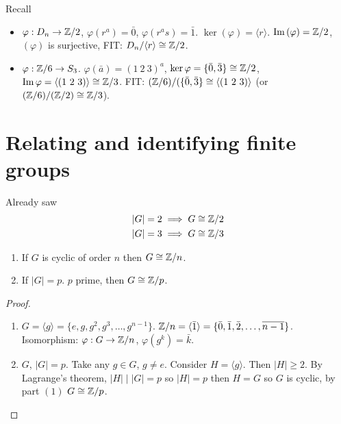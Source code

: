 \documentclass[10pt, a4paper]{article}
\begin{document}
\begin{example}
    Recall
    \begin{itemize}
        \item $\varphi : D_n \to \mathbb{Z} / 2$,
        $\varphi(r ^ a) = \bar{0}$,
        $\varphi(r ^ as) = \bar{1}$.
        $\ker(\varphi) = \langle r\rangle$.
        $\mathrm{Im}\,(\varphi) = \mathbb{Z} / 2$,
        $(\varphi)$ is surjective,
        FIT:
        $D_n / \langle r\rangle \cong \mathbb{Z} / 2$.

        \item $\varphi : \mathbb{Z} / 6 \to S_3$.
        $\varphi(\bar{a}) = (1\ 2\ 3) ^ a$,
        $\ker{\varphi} = \{\bar{0}, \bar{3}\} \cong \mathbb{Z} / 2$,
        $\Im{\varphi} = \langle (1\ 2\ 3)\rangle \cong \Z / 3$.
        FIT:
        $(\mathbb{Z} / 6) / (\{\bar{0}, \bar{3}\} \cong \langle (1\ 2\ 3)\rangle$
        (or $(\mathbb{Z} / 6) / (\mathbb{Z} / 2) \cong \mathbb{Z} / 3$).
    \end{itemize}
\end{example}

\newpage

\section{Relating and identifying finite groups}
Already saw
\begin{align*}
    |G| = 2 &\implies G \cong \mathbb{Z} / 2 \\
    |G| = 3 &\implies G \cong \mathbb{Z} / 3
\end{align*}

\begin{lemma}\phantom{}
    \begin{enumerate}[label = (\arabic*)]
        \item If $G$ is cyclic of order $n$ then $G \cong \mathbb{Z} / n$.

        \item If $|G| = p$.
        $p$ prime,
        then $G \cong \mathbb{Z} / p$.
    \end{enumerate}

    \begin{proof}\phantom{}
        \begin{enumerate}[label = (\arabic*)]
            \item $G = \langle g\rangle = \{e, g, g ^ 2, g ^ 3, \dotsc, g ^ {n - 1}\}$.
            $\mathbb{Z} / n = \langle \bar{1} \rangle = \{\bar{0}, \bar{1}, \bar{2}, \dotsc, \overline{n - 1}\}$.
            Isomorphism:
            $\varphi : G \to \mathbb{Z} / n$,
            $\varphi(g ^ k) = \bar{k}$.

            \item $G$,
            $|G| = p$.
            Take any $g \in G$,
            $g \neq e$.
            Consider $H = \langle g \rangle$.
            Then $|H| \geq 2$.
            By Lagrange's theorem,
            $|H| \mid |G| = p$ so $|H| = p$ then $H = G$ so $G$ is cyclic,
            by part $(1)$ $G \cong \mathbb{Z} / p$.
        \end{enumerate}
    \end{proof}
\end{lemma}
\end{document}
